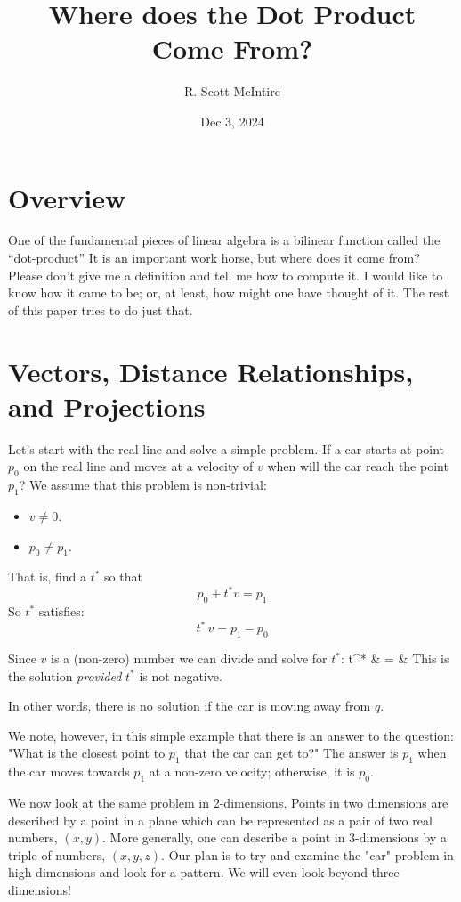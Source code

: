 \documentclass[12pt]{article}
\title{Where does the Dot Product Come From?}
\author{R. Scott McIntire}
\date{Dec 3, 2024}
\begin{document}
\maketitle

\section{Overview}
One of the fundamental pieces of linear algebra is a bilinear function
called the ``dot-product'' It is an important work horse, but where does
it come from? Please don't give me a definition and tell me how to compute it.
I would like to know how it came to be; or, at least, how might one
have thought of it. The rest of this paper tries to do just that.

\section{ Vectors, Distance Relationships, and Projections}
Let's start with the real line and solve a simple problem. 
If a car starts at 
point $p_0$ on the real line and moves at a velocity of $v$ when will the car 
reach the point $p_1$? We assume that this problem is non-trivial:
\begin{itemize}
	\item{$v \ne 0$.}
	\item{$p_0 \ne p_1$.}
\end{itemize}

That is, find a $t^*$ so that
$$ p_0 + t^* v = p_1$$
So $t^*$ satisfies:
$$ t^* \, v = p_1 - p_0$$

Since $v$ is a (non-zero) number we can divide and solve for 
$t^*$:%
\be
	t^* & = &  \label{closest_1}
\ee
This is the solution {\em provided\/} 
$t^*$ is not negative.

In other words, there is no solution if the car is 
moving away from $q$.

We note, however, in this simple example that there is an answer to the question:
"What is the closest point to $p_1$ that the car can get to?"
The answer is $p_1$ when the car moves towards $p_1$ at a non-zero velocity; otherwise,
it is $p_0$.

We now look at the same problem in 2-dimensions. Points in two dimensions 
are described by a point in a plane which can be represented as a pair of 
two real numbers, $(x, y)$. More generally, one can describe a point in 3-dimensions
by a triple of numbers, $(x, y, z)$. Our plan is to try and examine the "car"
problem in high dimensions and look for a pattern. We will even look beyond
three dimensions!
\end{document}
